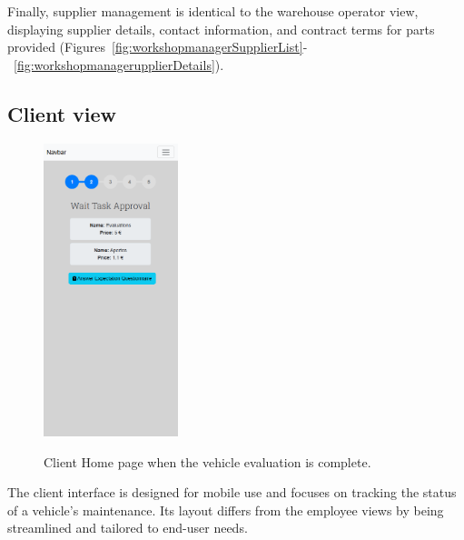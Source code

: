 Finally, supplier management is identical to the warehouse operator view, displaying supplier details, contact information, and contract terms for parts provided (Figures~\ref{fig:workshopmanagerSupplierList}-~\ref{fig:workshopmanagerupplierDetails}).



\subsection{Client view}

\begin{figure}[h]
  \caption{Client Home page when the vehicle evaluation is complete.}
  \centering
  \includegraphics[width=0.35\textwidth]{figs/Implementation/client/MaintenanceState2}
  \label{fig:MaintenanceState2}
\end{figure}


The client interface is designed for mobile use and focuses on tracking the status of a vehicle's maintenance. Its layout differs from the employee views by being streamlined and tailored to end-user needs.




